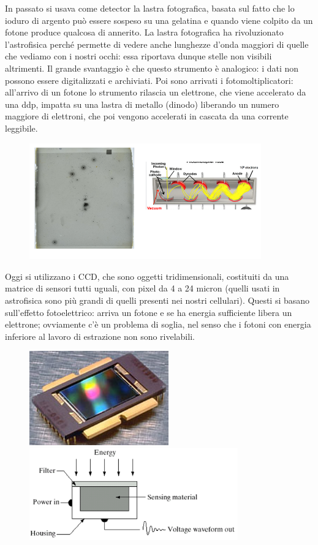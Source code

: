 \documentclass[a4paper,11pt]{article}
\begin{document}
\vspace{3mm}
In passato si usava come detector la lastra fotografica, basata sul fatto che lo ioduro di argento può essere sospeso su una gelatina e quando viene colpito da un fotone produce qualcosa di annerito. La lastra fotografica ha rivoluzionato l’astrofisica perché permette di vedere anche lunghezze d’onda maggiori di quelle che vediamo con i nostri occhi: essa riportava dunque stelle non visibili altrimenti. Il grande svantaggio è che questo strumento è analogico: i dati non possono essere digitalizzati e archiviati.
 Poi sono arrivati i fotomoltiplicatori: all’arrivo di un fotone lo strumento rilascia un elettrone, che viene accelerato da una ddp, impatta su una lastra di metallo (dinodo) liberando un numero maggiore di elettroni, che poi vengono accelerati in cascata da una corrente leggibile.
 \begin{figure}[h!!]
        \centering
        \includegraphics[width=10cm]{astro2.png}
        \label{}
    \end{figure}
 \newline
Oggi si utilizzano i CCD, che sono oggetti tridimensionali, costituiti da una matrice di sensori tutti uguali, con pixel da 4 a 24 micron (quelli usati in astrofisica sono più grandi di quelli presenti nei nostri cellulari). Questi si basano sull’effetto fotoelettrico: arriva un fotone e se ha energia sufficiente libera un elettrone; ovviamente c’è un problema di soglia, nel senso che i fotoni con energia inferiore al lavoro di estrazione non sono rivelabili. 
\newline
\begin{figure}[h!!]
        \centering
        \includegraphics[width=6cm]{astro3.png}
        \quad \includegraphics[width=9cm]{astro4.png}
        \label{}
    \end{figure}
\end{document}
